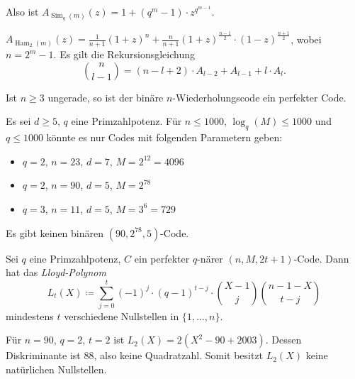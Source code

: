 \documentclass{cheat-sheet}
\DeclareMathOperator{\Ham}{Ham} %
\DeclareMathOperator{\Sim}{Sim} %
\newcommand{\Golay}{\mathcal{G}} %
\begin{document}
\begin{bem}
  Also ist $A_{\Sim_q(m)}(z) = 1 + (q^m - 1) \cdot z^{q^{m-1}}$.
\end{bem}


\begin{satz}
  $A_{\Ham_2(m)}(z) = \tfrac{1}{n+1} (1+z)^n + \tfrac{n}{n+1} (1+z)^{\tfrac{n-1}{2}} \cdot (1-z)^{\tfrac{n+1}{2}}$,
  wobei $n = 2^m - 1$.
  Es gilt die Rekursionsgleichung
  \[ {n \choose l-1} = (n-l+2) \cdot A_{l-2} + A_{l-1} + l \cdot A_l. \]
\end{satz}



\begin{prop}
  Ist $n \geq 3$ ungerade, so ist der binäre $n$-Wiederholungscode ein perfekter Code.
\end{prop}

\begin{bem}
  Es sei $d \geq 5$, $q$ eine Primzahlpotenz.
  Für $n \leq 1000$, $\log_q(M) \leq 1000$ und $q \leq 1000$ könnte es nur Codes mit folgenden Parametern geben:
  \begin{itemize}
    \item $q=2$, $n=23$, $d=7$, $M=2^{12} = 4096$ %
    \item $q=2$, $n=90$, $d=5$, $M=2^{78}$
    \item $q=3$, $n=11$, $d=5$, $M=3^6=729$ %
  \end{itemize}
\end{bem}

\begin{satz}
  Es gibt keinen binären $(90, 2^{78}, 5)$-Code.
\end{satz}

\begin{bem}
  Sei $q$ eine Primzahlpotenz, $C$ ein perfekter $q$-närer $(n, M, 2t+1)$-Code.
  Dann hat das \emph{Lloyd-Polynom}
  \[ L_t(X) \coloneqq \sum_{j=0}^t (-1)^j \cdot (q-1)^{t-j} \cdot {X-1 \choose j} {n-1-X \choose t-j} \]
  mindestens $t$ verschiedene Nullstellen in $\{ 1, \ldots, n \}$.
\end{bem}

\begin{bsp}
  Für $n=90$, $q=2$, $t=2$ ist $L_2(X) = 2 (X^2 - 90 + 2003)$.
  Dessen Diskriminante ist $88$, also keine Quadratzahl.
  Somit besitzt $L_2(X)$ keine natürlichen Nullstellen.
\end{bsp}
\end{document}
